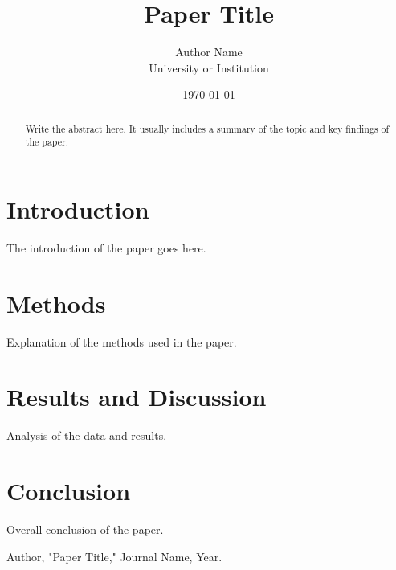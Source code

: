 \documentclass[12pt]{article}  %
\title{Paper Title}  %
\author{Author Name \\ University or Institution}  %
\date{\today}  %
\begin{document}
\maketitle  %

\begin{abstract}
Write the abstract here. It usually includes a summary of the topic and key findings of the paper.
\end{abstract}

\section{Introduction}
The introduction of the paper goes here.

\section{Methods}
Explanation of the methods used in the paper.

\section{Results and Discussion}
Analysis of the data and results.

\section{Conclusion}
Overall conclusion of the paper.

\begin{thebibliography}{9}
 Author, "Paper Title," Journal Name, Year.
\end{thebibliography}
\end{document}
